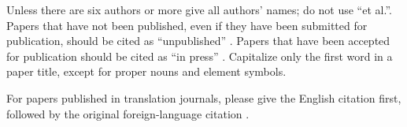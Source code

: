 \documentclass[conference]{IEEEtran}
\begin{document}
Unless there are six authors or more give all authors' names; do not use 
``et al.''. Papers that have not been published, even if they have been 
submitted for publication, should be cited as ``unpublished'' \cite{elissa}. Papers 
that have been accepted for publication should be cited as ``in press'' \cite{nicole}. 
Capitalize only the first word in a paper title, except for proper nouns and 
element symbols.

For papers published in translation journals, please give the English 
citation first, followed by the original foreign-language citation \cite{yorozu1987}.



\end{document}
